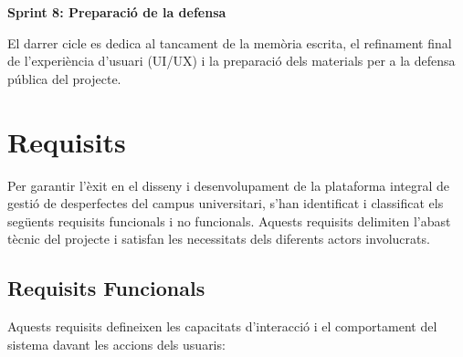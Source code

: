 \begin{flushleft}
	\textbf{Sprint 8: Preparació de la defensa} \\
\end{flushleft}
El darrer cicle es dedica al tancament de la memòria escrita, el refinament final de l'experiència d'usuari (UI/UX) i la preparació dels materials per a la defensa pública del projecte.


\section{Requisits}
Per garantir l'èxit en el disseny i desenvolupament de la plataforma integral de gestió de desperfectes del campus universitari, s'han identificat i classificat els següents requisits funcionals i no funcionals. Aquests requisits delimiten l'abast tècnic del projecte i satisfan les necessitats dels diferents actors involucrats.

\subsection{Requisits Funcionals}
Aquests requisits defineixen les capacitats d'interacció i el comportament del sistema davant les accions dels usuaris:

